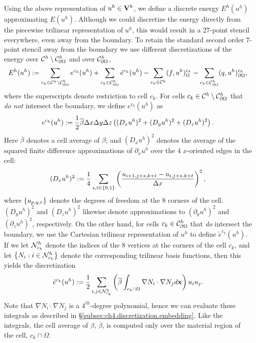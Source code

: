 Using the above representation of $u^h \in \mathbf{V}^h$, we define a discrete energy $E^h(u^h)$ approximating $E(u^h)$. Although we could discretize the energy directly from the piecewise trilinear representation of $u^h$, this would result in a $27$-point stencil everywhere, even away from the boundary. To retain the standard second order $7$-point stencil away from the boundary we use different discretizations of the energy over $\mathcal{C}^h \setminus \mathcal{C}^h_{\partial\Omega}$ and over $\mathcal{C}^h_{\partial\Omega}$,
\begin{equation} \label{eq:ch4.neumann.energy.discrete}
E^h(u^h) := \sum_{c_k \in \mathcal{C}^h \setminus \mathcal{C}_{\partial\Omega}^h} e^{c_k}(u^h) + \sum_{c_k \in \mathcal{C}_{\partial\Omega}^h} \tilde{e}^{c_k}(u^h) - \sum_{c_k \in \mathcal{C}^h} (f, u^h)^{c_k}_{\Omega} - \sum_{c_k \in \mathcal{C}_{\partial\Omega}^h} (q, u^h)^{c_k}_{\partial\Omega},
\end{equation}
where the superscripts denote restriction to cell $c_k$. For cells $c_k \in \mathcal{C}^h \setminus \mathcal{C}^h_{\partial\Omega}$ that \emph{do not} intersect the boundary, we define $e^{c_k}(u^h)$ as
\begin{equation*}
e^{c_k}(u^h) := \frac{1}{2} \overline{\beta} \Delta x \Delta y \Delta z \left( (D_x u^h)^2 + (D_y u^h)^2 + (D_z u^h)^2 \right).
\end{equation*}
Here $\overline{\beta}$ denotes a cell average of $\beta$; and $(D_x u^h)^2$ denotes the average of the squared finite difference approximations of $\partial_x u^h$ over the $4$ $x$-oriented edges in the cell:
\begin{equation*}
(D_x u^h)^2 := \frac{1}{4} \sum_{s,t \in \left\lbrace 0,1 \right\rbrace} \left( \frac{u_{i+1,j+s,k+t} - u_{i,j+s,k+t}}{\Delta x} \right)^2,
\end{equation*}
where $\left\lbrace u_{p,q,r} \right\rbrace$ denote the degrees of freedom at the $8$ corners of the cell. $(D_y u^h)^2$ and $(D_z u^h)^2$ likewise denote approximations to $(\partial_y u^h)^2$ and $(\partial_z u^h)^2$, respectively. On the other hand, for cells $c_k \in \mathcal{C}^h_{\partial\Omega}$ that \emph{do} intersect the boundary, we use the Cartesian trilinear representation of $u^h$ to define $\tilde{e}^{c_k}(u^h)$. If we let $\mathcal{N}^h_{c_k}$ denote the indices of the $8$ vertices at the corners of the cell $c_k$, and let $\left\lbrace N_i : i \in \mathcal{N}^h_{c_k} \right\rbrace$ denote the corresponding trilinear basis functions, then this yields the discretization
\begin{equation} \label{eq:ch4.neumann.energy.boundary}
\tilde{e}^{c_k}(u^h) := \frac{1}{2} \sum_{i,j \in \mathcal{N}^h_{c_k}} \left( \overline{\beta} \int_{c_k \cap \Omega} \nabla N_i \cdot \nabla N_j d\mathbf{x} \right) u_i u_j.
\end{equation}
Note that $\nabla N_i \cdot \nabla N_j$ is a $4^{th}$-degree polynomial, hence we can evaluate these integrals as described in \S\ref{subsec:ch4.discretization.embedding}. Like the integrals, the cell average of $\beta$, $\overline{\beta}$, is computed only over the material region of the cell, $c_k \cap \Omega$.

